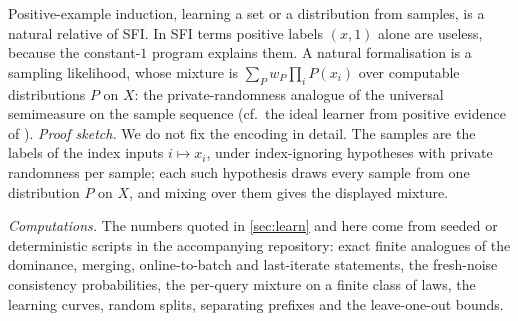 \begin{remark}\label{rem:learn:positive}
Positive-example induction, learning a set or a distribution from samples, is a natural relative of SFI. In SFI terms positive labels $(x,1)$ alone are useless, because the constant-$1$ program explains them. A natural formalisation is a sampling likelihood, whose mixture is $\sum_Pw_P\prod_iP(x_i)$ over computable distributions $P$ on $X$: the private-randomness analogue of the universal semimeasure on the sample sequence (cf.\ the ideal learner from positive evidence of \citealp{chater2007ideal}).
\emph{Proof sketch.} We do not fix the encoding in detail. The samples are the labels of the index inputs $i\mapsto x_i$, under index-ignoring hypotheses with private randomness per sample; each such hypothesis draws every sample from one distribution $P$ on $X$, and mixing over them gives the displayed mixture.
\end{remark}

\emph{Computations.} The numbers quoted in \cref{sec:learn} and here come from seeded or deterministic scripts in the accompanying repository: exact finite analogues of the dominance, merging, online-to-batch and last-iterate statements, the fresh-noise consistency probabilities, the per-query mixture on a finite class of laws, the learning curves, random splits, separating prefixes and the leave-one-out bounds.
